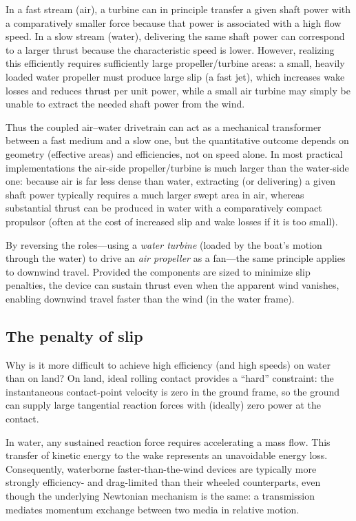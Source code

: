 \documentclass[reprint,aps,pra,longbibliography]{revtex4-2}
\begin{document}
In a fast stream (air), a turbine can in principle transfer a given shaft power
with a comparatively smaller force because that power is associated with a high
flow speed.  In a slow stream (water), delivering the same shaft power can
correspond to a larger thrust because the characteristic speed is lower.
However, realizing this efficiently requires sufficiently large propeller/turbine
areas: a small, heavily loaded water propeller must produce large slip (a fast
jet), which increases wake losses and reduces thrust per unit power, while a
small air turbine may simply be unable to extract the needed shaft power from
the wind.

Thus the coupled air--water drivetrain can act as a mechanical transformer
between a fast medium and a slow one, but the quantitative outcome depends on
geometry (effective areas) and efficiencies, not on speed alone.  In most
practical implementations the air-side propeller/turbine is much larger than
the water-side one: because air is far less dense than water, extracting (or
delivering) a given shaft power typically requires a much larger swept area in
air, whereas substantial thrust can be produced in water with a comparatively
compact propulsor (often at the cost of increased slip and wake losses if it is
too small).

By reversing the roles---using a \emph{water turbine} (loaded by the boat's
motion through the water) to drive an \emph{air propeller} as a fan---the same
principle applies to downwind travel. Provided the components are sized to
minimize slip penalties, the device can sustain thrust even when the apparent
wind vanishes, enabling downwind travel faster than the wind (in the water
frame).

\subsection{The penalty of slip}

Why is it more difficult to achieve high efficiency (and high speeds) on water than on land?
On land, ideal rolling contact provides a ``hard'' constraint: the instantaneous
contact-point velocity is zero in the ground frame, so the ground can supply
large tangential reaction forces with (ideally) zero power at the contact.

In water, any sustained reaction force requires accelerating a mass flow. This
transfer of kinetic energy to the wake represents an unavoidable energy loss.
Consequently, waterborne faster-than-the-wind devices are
typically more strongly efficiency- and drag-limited than their wheeled
counterparts, even though the underlying Newtonian mechanism is the same: a
transmission mediates momentum exchange between two media in relative motion.
\end{document}

